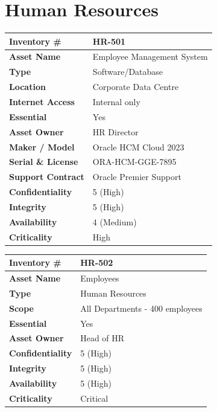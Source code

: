 \section*{Human Resources}

\begin{longtable}{|p{4cm}|p{9cm}|}
\hline
\textbf{Inventory \#} & \ac{HR}-501 \\\hline
\textbf{Asset Name} & Employee Management System \\\hline
\textbf{Type} & Software/Database \\\hline
\textbf{Location} & Corporate Data Centre \\\hline
\textbf{Internet Access} & Internal only \\\hline
\textbf{Essential} & Yes \\\hline
\textbf{Asset Owner} & \ac{HR} Director \\\hline
\textbf{Maker / Model} & Oracle HCM Cloud 2023 \\\hline
\textbf{Serial \& License} & ORA-HCM-GGE-7895 \\\hline
\textbf{Support Contract} & Oracle Premier Support \\\hline
\textbf{Confidentiality} & 5 (High) \\\hline
\textbf{Integrity} & 5 (High) \\\hline
\textbf{Availability} & 4 (Medium) \\\hline
\textbf{Criticality} & High \\\hline
\end{longtable}

\begin{longtable}{|p{4cm}|p{9cm}|}
\hline
\textbf{Inventory \#} & \ac{HR}-502 \\\hline
\textbf{Asset Name} & Employees \\\hline
\textbf{Type} & Human Resources \\\hline
\textbf{Scope} & All Departments - 400 employees\\\hline
\textbf{Essential} & Yes \\\hline
\textbf{Asset Owner} & Head of \ac{HR} \\\hline
\textbf{Confidentiality} & 5 (High) \\\hline
\textbf{Integrity} & 5 (High) \\\hline
\textbf{Availability} & 5 (High) \\\hline
\textbf{Criticality} & Critical \\\hline
\end{longtable}
